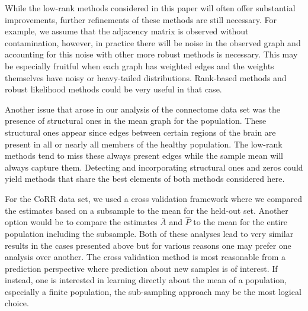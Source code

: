 \documentclass[10pt,letterpaper]{article}
\begin{document}


While the low-rank methods considered in this paper will often offer substantial improvements, further refinements of these methods are still necessary.
For example, we assume that the adjacency matrix is observed without contamination, however, in practice there will be noise in the observed graph and accounting for this noise with other more robust methods is necessary.
This may be especially fruitful when each graph has weighted edges and the weights themselves have noisy or heavy-tailed distributions.
Rank-based methods and robust likelihood methods could be very useful in that case. 


Another issue that arose in our analysis of the connectome data set was the presence of structural ones in the mean graph for the population. 
These structural ones appear since edges between certain regions of the brain are present in all or nearly all members of the healthy population. 
The low-rank methods tend to miss these always present edges while the sample mean will always capture them.
Detecting and incorporating structural ones and zeros could yield methods that share the best elements of both methods considered here.

For the CoRR data set, we used a cross validation framework where we compared the estimates based on a subsample to the mean for the held-out set. 
Another option would be to compare the estimates $\bar{A}$ and $\hat{P}$ to the mean for the entire population including the subsample.
Both of these analyses lead to very similar results in the cases presented above but for various reasons one may prefer one analysis over another.
The cross validation method is most reasonable from a prediction perspective where prediction about new samples is of interest.
If instead, one is interested in learning directly about the mean of a population, especially a finite population, the sub-sampling approach may be the most logical choice.
\end{document}
